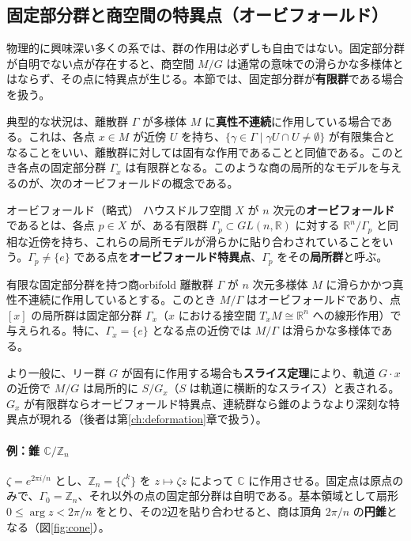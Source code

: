 \documentclass[uplatex, dvipdfmx, book]{jsbook}
\let\origsubsection\subsection
\let\origsubsubsection\subsubsection
\renewcommand{\section}{\origsubsection}
\renewcommand{\subsection}{\origsubsubsection}
\renewcommand{\subsubsection}{\paragraph}
\begin{document}
\section{固定部分群と商空間の特異点（オービフォールド）}

物理的に興味深い多くの系では、群の作用は必ずしも自由ではない。固定部分群が自明でない点が存在すると、商空間 $M/G$ は通常の意味での滑らかな多様体とはならず、その点に特異点が生じる。本節では、固定部分群が\textbf{有限群}である場合を扱う。

典型的な状況は、離散群 $\Gamma$ が多様体 $M$ に\textbf{真性不連続}に作用している場合である。これは、各点 $x \in M$ が近傍 $U$ を持ち、$\{ \gamma \in \Gamma \mid \gamma U \cap U \neq \emptyset \}$ が有限集合となることをいい、離散群に対しては固有な作用であることと同値である。このとき各点の固定部分群 $\Gamma_x$ は有限群となる。このような商の局所的なモデルを与えるのが、次のオービフォールドの概念である。

\begin{mydef}{オービフォールド（略式）}{}
ハウスドルフ空間 $X$ が $n$ 次元の\textbf{オービフォールド}であるとは、各点 $p \in X$ が、ある有限群 $\Gamma_p \subset GL(n, \mathbb{R})$ に対する $\mathbb{R}^n / \Gamma_p$ と同相な近傍を持ち、これらの局所モデルが滑らかに貼り合わされていることをいう。$\Gamma_p \neq \{e\}$ である点を\textbf{オービフォールド特異点}、$\Gamma_p$ をその\textbf{局所群}と呼ぶ。
\end{mydef}

\begin{mythm}{有限な固定部分群を持つ商}{orbifold}
離散群 $\Gamma$ が $n$ 次元多様体 $M$ に滑らかかつ真性不連続に作用しているとする。このとき $M/\Gamma$ はオービフォールドであり、点 $[x]$ の局所群は固定部分群 $\Gamma_x$（$x$ における接空間 $T_x M \cong \mathbb{R}^n$ への線形作用）で与えられる。特に、$\Gamma_x = \{e\}$ となる点の近傍では $M/\Gamma$ は滑らかな多様体である。
\end{mythm}

より一般に、リー群 $G$ が固有に作用する場合も\textbf{スライス定理}により、軌道 $G \cdot x$ の近傍で $M/G$ は局所的に $S/G_x$（$S$ は軌道に横断的なスライス）と表される。$G_x$ が有限群ならオービフォールド特異点、連続群なら錐のようなより深刻な特異点が現れる（後者は第\ref{ch:deformation}章で扱う）。

\paragraph{例：錐 $\mathbb{C}/\mathbb{Z}_n$}
$\zeta = e^{2\pi i/n}$ とし、$\mathbb{Z}_n = \{ \zeta^k \}$ を $z \mapsto \zeta z$ によって $\mathbb{C}$ に作用させる。固定点は原点のみで、$\Gamma_0 = \mathbb{Z}_n$、それ以外の点の固定部分群は自明である。基本領域として扇形 $0 \le \arg z < 2\pi/n$ をとり、その2辺を貼り合わせると、商は頂角 $2\pi/n$ の\textbf{円錐}となる（図\ref{fig:cone}）。
\end{document}
